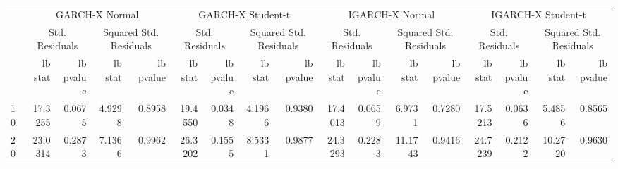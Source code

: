 \begin{table}[htbp]
\centering
\begin{tabular}{lrrrrrrrrrrrrrrrr}
\toprule
 & \multicolumn{4}{c}{GARCH-X Normal} & \multicolumn{4}{c}{GARCH-X Student-t} & \multicolumn{4}{c}{IGARCH-X Normal} & \multicolumn{4}{c}{IGARCH-X Student-t} \\
 & \multicolumn{2}{c}{Std. Residuals} & \multicolumn{2}{c}{Squared Std. Residuals} & \multicolumn{2}{c}{Std. Residuals} & \multicolumn{2}{c}{Squared Std. Residuals} & \multicolumn{2}{c}{Std. Residuals} & \multicolumn{2}{c}{Squared Std. Residuals} & \multicolumn{2}{c}{Std. Residuals} & \multicolumn{2}{c}{Squared Std. Residuals} \\
 & lb stat & lb pvalue & lb stat & lb pvalue & lb stat & lb pvalue & lb stat & lb pvalue & lb stat & lb pvalue & lb stat & lb pvalue & lb stat & lb pvalue & lb stat & lb pvalue \\
\midrule
10 & 17.3255 & 0.0675 & 4.9298 & 0.8958 & 19.4550 & 0.0348 & 4.1966 & 0.9380 & 17.4013 & 0.0659 & 6.9731 & 0.7280 & 17.5213 & 0.0636 & 5.4856 & 0.8565 \\
20 & 23.0314 & 0.2873 & 7.1366 & 0.9962 & 26.3202 & 0.1555 & 8.5331 & 0.9877 & 24.3293 & 0.2283 & 11.1743 & 0.9416 & 24.7239 & 0.2122 & 10.2720 & 0.9630 \\
\bottomrule
\end{tabular}
\label{tab:residual_diagnostics}
\end{table}
